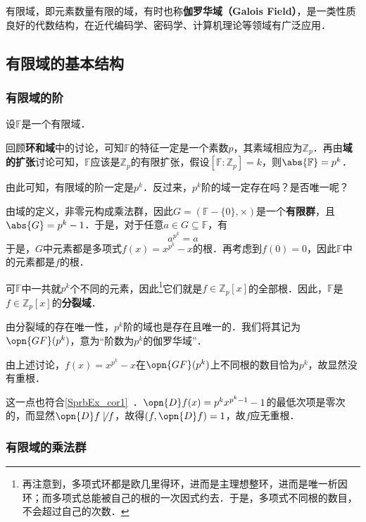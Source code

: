 

有限域，即元素数量有限的域，有时也称\textbf{伽罗华域（Galois Field）}，是一类性质良好的代数结构，在近代编码学、密码学、计算机理论等领域有广泛应用．

\subsection{有限域的基本结构}

\subsubsection{有限域的阶}

设$\mathbb{F}$是一个有限域．

回顾\textbf{环和域}中的讨论，可知$\mathbb{F}$的特征一定是一个素数$p$，其素域相应为$\mathbb{Z}_p$．再由\textbf{域的扩张}讨论可知，$\mathbb{F}$应该是$\mathbb{Z}_p$的有限扩张，假设$[\mathbb{F}:\mathbb{Z}_p]=k$，则$\abs{\mathbb{F}}=p^k$．

由此可知，有限域的阶一定是$p^k$．反过来，$p^k$阶的域一定存在吗？是否唯一呢？

由域的定义，非零元构成乘法群，因此$G=(\mathbb{F}-\{0\}, \times)$是一个\textbf{有限群}，且$\abs{G}=p^k-1$．于是，对于任意$a\in G\subseteq\mathbb{F}$，有
\begin{equation}
a^{p^k}=a
\end{equation}
于是，$G$中元素都是多项式$f(x)=x^{p^k}-x$的根．再考虑到$f(0)=0$，因此$\mathbb{F}$中的元素都是$f$的根．

可$\mathbb{F}$中一共就$p^k$个不同的元素，因此\footnote{再注意到，多项式环都是欧几里得环，进而是主理想整环，进而是唯一析因环；而多项式总能被自己的根的一次因式约去．于是，多项式不同根的数目，不会超过自己的次数．}它们就是$f\in\mathbb{Z}_p[x]$的全部根．因此，$\mathbb{F}$是$f\in\mathbb{Z}_p[x]$的\textbf{分裂域}．

由分裂域的存在唯一性，$p^k$阶的域也是存在且唯一的．我们将其记为$\opn{GF}(p^k)$，意为“阶数为$p^k$的伽罗华域”．

\begin{example}{}
由上述讨论，$f(x)=x^{p^k}-x$在$\opn{GF}(p^k)$上不同根的数目恰为$p^k$，故显然没有重根．

这一点也符合\autoref{SprbEx_cor1}~．$\opn{D}f(x)=p^kx^{p^k-1}-1$的最低次项是零次的，而显然$\opn{D}f\not\mid f$，故得$(f, \opn{D}f)=1$，故$f$应无重根．
\end{example}



\subsubsection{有限域的乘法群}





























